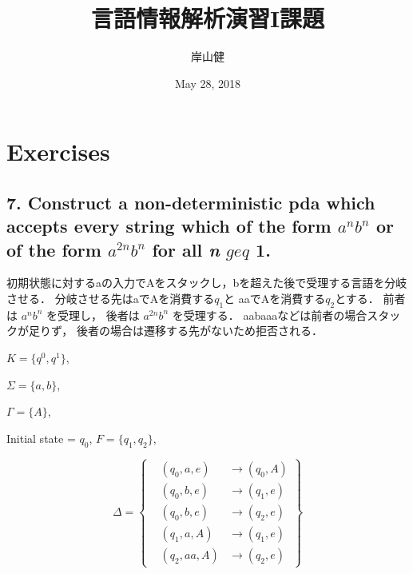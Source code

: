\documentclass[]{ltjsarticle}
\title{言語情報解析演習I課題}
\author{岸山健}
\date{May 28, 2018}
\begin{document}
\maketitle

\hypertarget{exercises}{%
\section{Exercises}\label{exercises}}

\hypertarget{construct-a-non-deterministic-pda-which-accepts-every-string-which-of-the-form-anbn-or-of-the-form-a2nbn-for-all-n-geq-1.}{%
\subsection{\texorpdfstring{7. Construct a non-deterministic pda which
accepts every string which of the form \(a^nb^n\) or of the form
\(a^{2n}b^n\) for all \emph{n} \(geq\)
1.}{7. Construct a non-deterministic pda which accepts every string which of the form a\^{}nb\^{}n or of the form a\^{}\{2n\}b\^{}n for all n geq 1.}}\label{construct-a-non-deterministic-pda-which-accepts-every-string-which-of-the-form-anbn-or-of-the-form-a2nbn-for-all-n-geq-1.}}

初期状態に対するaの入力でAをスタックし，bを超えた後で受理する言語を分岐させる．
分岐させる先はaでAを消費する\(q_1\)と aaでAを消費する\(q_2\)とする．
前者は \(a^nb^n\) を受理し， 後者は \(a^{2n}b^n\) を受理する．
aabaaaなどは前者の場合スタックが足りず，
後者の場合は遷移する先がないため拒否される．

\(K = \{q^0, q^1\}\),

\(\Sigma = \{a, b\}\),

\(\Gamma = \{A\}\),

Initial state = \(q_0\), \(F = \{q_1, q_2\}\),

\[
\Delta              =  \left\{
                        \begin{aligned}
                        &(q_0,a,e) &\rightarrow (q_0,A)\\
                        &(q_0,b,e) &\rightarrow (q_1,e)\\
                        &(q_0,b,e) &\rightarrow (q_2,e)\\
                        &(q_1,a,A) &\rightarrow (q_1,e)\\
                        &(q_2,aa,A) &\rightarrow (q_2,e)
                        \end{aligned}
                        \right\}
\]
\end{document}
